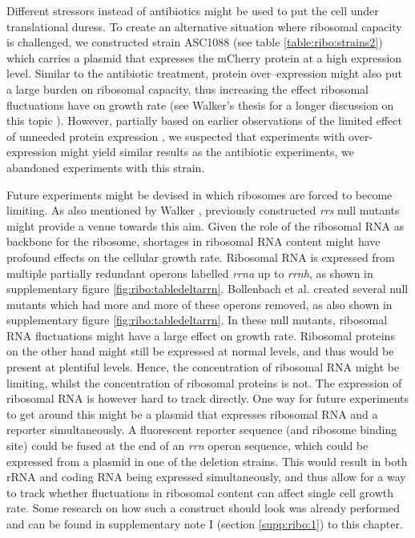 %
Different stressors instead of antibiotics might be used to put the cell under translational duress.
%
To create an alternative situation where ribosomal capacity is challenged, 
we constructed strain ASC1088 (see table \ref{table:ribo:strains2}) which carries a plasmid that expresses the mCherry protein at a high expression level.
%
Similar to the antibiotic treatment, protein over--expression might also put a large burden on ribosomal capacity, thus increasing the effect ribosomal fluctuations have on growth rate (see Walker's thesis for a longer discussion on this topic \cite{Walker2016t}).
%
However, partially based on earlier observations of the limited effect of unneeded protein expression \cite{Shachrai2010},
we suspected that experiments with over-expression might yield similar results as the antibiotic experiments, 
we abandoned experiments with this strain.

Future experiments might be devised in which ribosomes are forced to become limiting.
%
As also mentioned by Walker \cite{Walker2016t}, previously constructed \textit{rrs} null mutants \cite{Condon1993, Condon1995, Quan2015, Bollenbach2009, Gyorfy2015} might provide a venue towards this aim.
%
Given the role of the ribosomal RNA as backbone for the ribosome, shortages in ribosomal RNA content might have profound effects on the cellular growth rate.
%
Ribosomal RNA is expressed from multiple partially redundant operons labelled \textit{rrna} up to \textit{rrnh}, as shown in supplementary figure \ref{fig:ribo:tabledeltarrn}. 
%
Bollenbach et al. \cite{Bollenbach2009} created several null mutants which had more and more of these operons removed, as also shown in supplementary figure \ref{fig:ribo:tabledeltarrn}. 
%
In these null mutants, ribosomal RNA fluctuations might have a large effect on growth rate.
Ribosomal proteins on the other hand might still be expressed at normal levels, and thus would be present at plentiful levels.
Hence, the concentration of ribosomal RNA might be limiting, whilst the concentration of ribosomal proteins is not.
The expression of ribosomal RNA is however hard to track directly.
%
One way for future experiments to get around this might be a plasmid that expresses ribosomal RNA and a reporter simultaneously.
%
A fluorescent reporter sequence (and ribosome binding site) could be fused at the end of an \textit{rrn} operon sequence, which could be expressed from a plasmid in one of the deletion strains.
%
This would result in both rRNA and coding RNA being expressed simultaneously, and thus allow for a way to track whether 
fluctuations in ribosomal content can affect single cell growth rate.
%
Some research on how such a construct should look was already performed and can be found in supplementary note I (section \ref{supp:ribo:1}) to this chapter.
%




